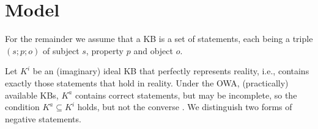 \section{Model}
\label{sec:formalization}


For the remainder we assume that a KB is a set of statements, each being a triple $(s;p;o)$ of subject $s$, property $p$ and object $o$.


Let $K^i$ be an (imaginary) ideal KB that perfectly represents reality, i.e., contains exactly those statements that hold in reality. Under the OWA, (practically) available KBs, $K^a$ contains correct statements, but may be incomplete, so the condition $K^a \subseteq K^i$ holds, but not the converse \cite{razniewski2011completeness}.
We distinguish two forms of negative statements.


